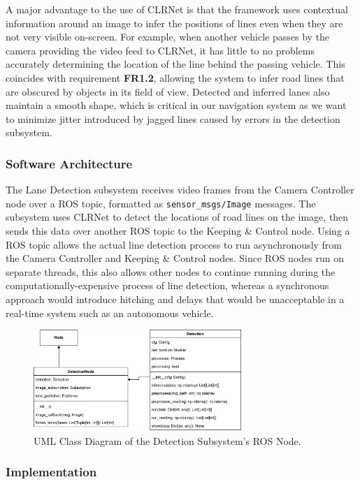 \documentclass[titlepage]{article}
\begin{document}
{A major advantage to the use of CLRNet is that the framework uses contextual information around an image to infer the positions
of lines even when they are not very visible on-screen.
For example, when another vehicle passes by the camera providing the video feed to CLRNet, it has little to no problems
accurately determining the location of the line behind the passing vehicle.
This coincides with requirement \textbf{FR1.2}, allowing the system to infer road lines that are obscured by objects in its field
of view.
Detected and inferred lanes also maintain a smooth shape, which is critical in our navigation system as we want to minimize
jitter introduced by jagged lines caused by errors in the detection subsystem.

\subsubsection{Software Architecture}

The Lane Detection subsystem receives video frames from the Camera Controller node over a ROS topic, formatted as
\texttt{sensor\_msgs/Image} messages.
The subsystem uses CLRNet to detect the locations of road lines on the image, then sends this data over another ROS topic to the
Keeping \& Control node.
Using a ROS topic allows the actual line detection process to run asynchronously from the Camera Controller and Keeping \& Control nodes.
Since ROS nodes run on separate threads, this also allows other nodes to continue running during the computationally-expensive process
of line detection, whereas a synchronous approach would introduce hitching and delays that would be unacceptable in a real-time system
such as an autonomous vehicle.

\begin{figure}
	\centering
	\includegraphics[width=0.7\textwidth]{Detection-UML}
	\caption{UML Class Diagram of the Detection Subsystem's ROS Node.}
	\label{Detection-UML}
\end{figure}

\subsubsection{Implementation}
}
\end{document}
